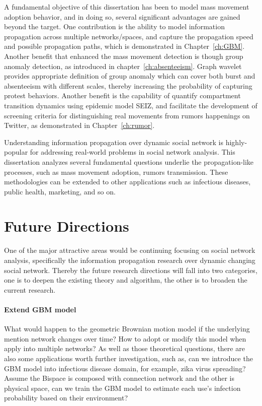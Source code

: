 A fundamental objective of this dissertation has been to model mass movement adoption behavior, and in doing so, several significant advantages are gained beyond the target. One contribution is the ability to model information propagation across multiple networks/spaces, and capture the propagation speed and possible propagation paths, which is demonstrated in Chapter~\ref{ch:GBM}. Another benefit that enhanced the mass movement detection is though group anomaly detection, as introduced in chapter~\ref{ch:absenteeism}. Graph wavelet provides appropriate definition of group anomaly which can cover both burst and absenteeism with different scales, thereby increasing the probability of capturing protest behaviors. Another benefit is the capability of quantify compartment transition dynamics using epidemic model SEIZ, and facilitate the development of screening criteria for distinguishing real movements from rumors happenings on Twitter, as demonstrated in Chapter~\ref{ch:rumor}.

Understanding information propagation over dynamic social network is highly-popular for addressing real-world problems in social network analysis. This dissertation analyzes several fundamental questions underlie the propagation-like processes, such as mass movement adoption, rumors transmission. These methodologies can be extended to other applications such as infectious diseases, public health, marketing, and so on.

\section{Future Directions}
One of the major attractive areas would be continuing focusing on social network analysis, specifically the information propagation research over dynamic changing social network. Thereby the future research directions will fall into two categories, one is to deepen the existing theory and algorithm, the other is to broaden the current research.

\paragraph{Extend GBM model}
What would happen to the geometric Brownian motion model if the underlying mention network changes over time? How to adopt or modify this model when apply into multiple networks? As well as those theoretical questions, there are also some applications worth further investigation, such as, can we introduce the GBM model into infectious disease domain, for example, zika virus spreading? Assume the Bispace is composed with connection network and the other is physical space, can we train the GBM model to estimate each use's infection probability based on their environment?


